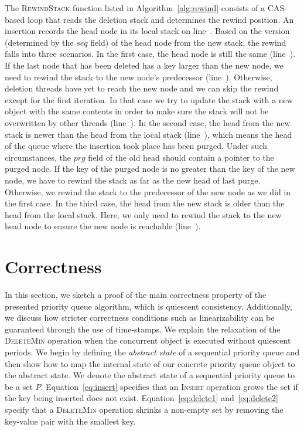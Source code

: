 \documentclass[10pt,journal,letterpaper,compsoc]{IEEEtran}
\begin{document}
The \textsc{RewindStack} function listed in Algorithm~\ref{alg:rewind} consists of a CAS-based loop that reads the deletion stack and determines the rewind position.
An insertion records the head node in its local stack on line~.
Based on the version (determined by the $seq$ field) of the head node from the new stack, the rewind falls into three scenarios.
In the first case, the head node is still the same (line~).
If the last node that has been deleted has a key larger than the new node, we need to rewind the stack to the new node's predecessor (line~).
Otherwise, deletion threads have yet to reach the new node and we can skip the rewind except for the first iteration.
In that case we try to update the stack with a new object with the same contents in order to make sure the stack will not be overwritten by other threads (line~).
In the second case, the head from the new stack is newer than the head from the local stack (line~), which means the head of the queue where the insertion took place has been purged.  
Under such circumstances, the $prg$ field of the old head should contain a pointer to the purged node.
If the key of the purged node is no greater than the key of the new node, we have to rewind the stack as far as the new head of last purge.
Otherwise, we rewind the stack to the predecessor of the new node as we did in the first case.
In the third case, the head from the new stack is older than the head from the local stack. Here, we only need to rewind the stack to the new head node to ensure the new node is reachable (line~).


\section{Correctness}
\label{sec:correctness}
In this section, we sketch a proof of the main correctness property of the presented priority queue algorithm, which is quiescent consistency. Additionally, we discuss how stricter correctness conditions such as linearizability can be guaranteed through the use of time-stamps.
We explain the relaxation of the \textsc{DeleteMin} operation when the concurrent object is executed without quiescent periods. 
We begin by defining the \emph{abstract state} of a sequential priority queue and then show how to map the internal state of our concrete priority queue object to the abstract state.
We denote the abstract state of a sequential priority queue to be a set $P$.
Equation~\ref{eq:insert} specifies that an \textsc{Insert} operation grows the set if the key being inserted does not exist.
Equation~\ref{eq:delete1} and~\ref{eq:delete2} specify that a \textsc{DeleteMin} operation shrinks a non-empty set by removing the key-value pair with the smallest key.
\end{document}
